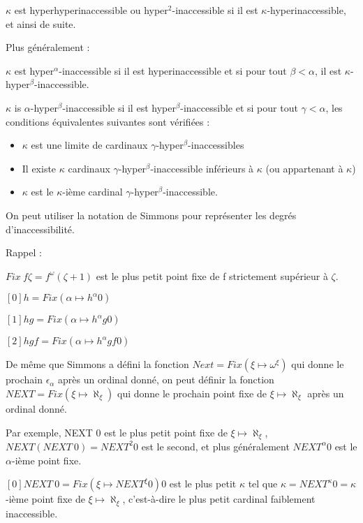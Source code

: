 \documentclass[12pt]{beamer}
\begin{document}
\begin{frame}

$\kappa$ est hyperhyperinaccessible ou hyper$^2$-inaccessible si il est $\kappa$-hyperinaccessible, et ainsi de suite.

Plus généralement :

\(\kappa\) est hyper\(^\alpha\)-inaccessible si il est hyperinaccessible et si pour tout \( \beta < \alpha \), il est \(\kappa\)-hyper\(^\beta\)-inaccessible.

\(\kappa\) is \(\alpha\)-hyper\(^\beta\)-inaccessible si il est hyper\(^\beta\)-inaccessible et si pour tout \( \gamma < \alpha \), les conditions équivalentes suivantes sont vérifiées :

\begin{itemize}
     \setlength{\itemsep}{1pt}
     \setlength{\parskip}{0pt}
     \setlength{\parsep}{0pt}
\item \(\kappa\)  est une limite de cardinaux \(\gamma\)-hyper\(^\beta\)-inaccessibles
\item Il existe \(\kappa\) cardinaux \(\gamma\)-hyper\(^\beta\)-inaccessible inférieurs à \(\kappa\) (ou appartenant à \(\kappa\))
\item \(\kappa\) est le \(\kappa\)-ième cardinal \(\gamma\)-hyper\(^\beta\)-inaccessible.
\end{itemize}

\end{frame}
\begin{frame}

\small

On peut utiliser la notation de Simmons pour représenter les degrés d'inaccessibilité.

Rappel :

\( Fix\ f \zeta = f^\omega (\zeta+1) \) est le plus petit point fixe de f strictement supérieur à \( \zeta \).

\( [0] h = Fix (\alpha \mapsto h^\alpha 0) \)

\( [1] h g = Fix (\alpha \mapsto h^\alpha g 0)  \)

\( [2] h g f = Fix (\alpha \mapsto h^\alpha g f 0) \)

De même que Simmons a défini la fonction \( Next = Fix (\xi \mapsto \omega^\xi) \) qui donne le prochain \( \epsilon_\alpha \) après un ordinal donné, on peut définir la fonction \( NEXT = Fix (\xi \mapsto \aleph_\xi) \) qui donne le prochain point fixe de \( \xi \mapsto \aleph_\xi \) après un ordinal donné.

Par exemple, NEXT 0 est le plus petit point fixe de \( \xi \mapsto \aleph_\xi \), \( NEXT (NEXT\ 0) = NEXT^2 0 \) est le second, et plus généralement \( NEXT^\alpha 0 \) est le $\alpha$-ième point fixe.

\( [0] NEXT\ 0 = Fix (\xi \mapsto NEXT^\xi 0) 0 \) est le plus petit $\kappa$ tel que \( \kappa = NEXT^\kappa 0 = \kappa\)-ième point fixe de \( \xi \mapsto \aleph_\xi \), c'est-à-dire le plus petit cardinal faiblement inaccessible.

\end{frame}
\end{document}
